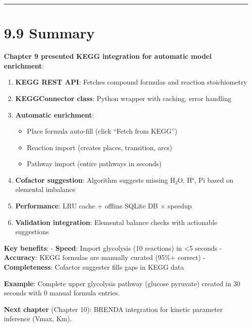 \begin{center}\rule{0.5\linewidth}{0.5pt}\end{center}

\hypertarget{summary}{%
\section{9.9 Summary}\label{summary}}

\textbf{Chapter 9 presented KEGG integration for automatic model
enrichment}:

\begin{enumerate}
\def\labelenumi{\arabic{enumi}.}
\tightlist
\item
  \textbf{KEGG REST API}: Fetches compound formulas and reaction
  stoichiometry
\item
  \textbf{KEGGConnector class}: Python wrapper with caching, error
  handling
\item
  \textbf{Automatic enrichment}:

  \begin{itemize}
  \tightlist
  \item
    Place formula auto-fill (click ``Fetch from KEGG'')
  \item
    Reaction import (creates places, transition, arcs)
  \item
    Pathway import (entire pathways in seconds)
  \end{itemize}
\item
  \textbf{Cofactor suggestion}: Algorithm suggests missing H₂O, H⁺, Pi
  based on elemental imbalance
\item
  \textbf{Performance}: LRU cache + offline SQLite DB × speedup
\item
  \textbf{Validation integration}: Elemental balance checks with
  actionable suggestions
\end{enumerate}

\textbf{Key benefits}: - \textbf{Speed}: Import glycolysis (10
reactions) in \textless5 seconds - \textbf{Accuracy}: KEGG formulas are
manually curated (95\%+ correct) - \textbf{Completeness}: Cofactor
suggester fills gaps in KEGG data

\textbf{Example}: Complete upper glycolysis pathway (glucose \textrightarrow pyruvate)
created in 30 seconds with 0 manual formula entries.

\textbf{Next chapter} (Chapter 10): BRENDA integration for kinetic
parameter inference (Vmax, Km).
